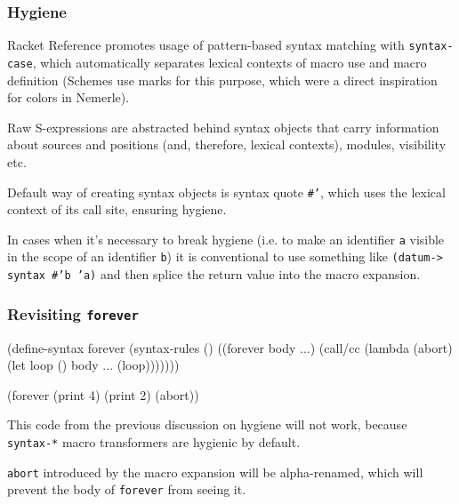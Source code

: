 \documentclass[hyperref={bookmarks=false}]{beamer}
\begin{document}
\begin{frame}[fragile]
\frametitle{Hygiene}

Racket Reference promotes usage of pattern-based syntax matching with \texttt{syntax-case},
which automatically separates lexical contexts of macro use and macro definition
(Schemes use marks for this purpose, which were a direct inspiration for colors in Nemerle).

Raw S-expressions are abstracted behind syntax objects that carry information
about sources and positions (and, therefore, lexical contexts), modules, visibility etc.

Default way of creating syntax objects is syntax quote \texttt{\#'}, which uses the lexical
context of its call site, ensuring hygiene.

In cases when it's necessary to break hygiene (i.e. to make an identifier \texttt{a} visible
in the scope of an identifier \texttt{b}) it is conventional to use something like
\texttt{(datum-> syntax \#'b 'a)} and then splice the return value into the macro expansion.
\end{frame}

\begin{frame}[fragile]
\frametitle{Revisiting \texttt{forever}}

\begin{lstlistinglike}
\begin{semiverbatim}
(define-syntax forever
  (syntax-rules ()
    ((forever body ...)
     (call/cc (lambda (\alert{abort})
                (let loop () body ... (loop)))))))

(forever (print 4) (print 2) (\alert{abort}))
\end{semiverbatim}
\end{lstlistinglike}

This code from the previous discussion on hygiene will not work,
because \texttt{syntax-*} macro transformers are hygienic by default.

\texttt{abort} introduced by the macro expansion will be alpha-renamed,
which will prevent the body of \texttt{forever} from seeing it.
\end{frame}
\end{document}
